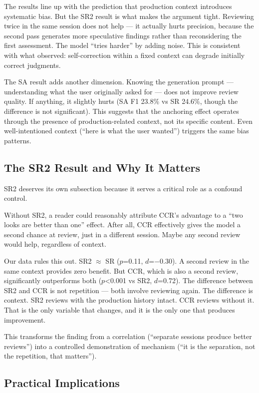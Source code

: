 \documentclass[11pt]{article}
\begin{document}
The results line up with the prediction that production context introduces systematic bias. But the SR2 result is what makes the argument tight. Reviewing twice in the same session does not help --- it actually hurts precision, because the second pass generates more speculative findings rather than reconsidering the first assessment. The model ``tries harder'' by adding noise. This is consistent with what \citet{zhang2025dark} observed: self-correction within a fixed context can degrade initially correct judgments.

The SA result adds another dimension. Knowing the generation prompt --- understanding what the user originally asked for --- does not improve review quality. If anything, it slightly hurts (SA F1 23.8\% vs SR 24.6\%, though the difference is not significant). This suggests that the anchoring effect operates through the presence of production-related context, not its specific content. Even well-intentioned context (``here is what the user wanted'') triggers the same bias patterns.

\subsection{The SR2 Result and Why It Matters}

SR2 deserves its own subsection because it serves a critical role as a confound control.

Without SR2, a reader could reasonably attribute CCR's advantage to a ``two looks are better than one'' effect. After all, CCR effectively gives the model a second chance at review, just in a different session. Maybe any second review would help, regardless of context.

Our data rules this out. SR2 $\approx$ SR ($p$=0.11, $d$=$-$0.30). A second review in the same context provides zero benefit. But CCR, which is also a second review, significantly outperforms both ($p$<0.001 vs SR2, $d$=0.72). The difference between SR2 and CCR is not repetition --- both involve reviewing again. The difference is context. SR2 reviews with the production history intact. CCR reviews without it. That is the only variable that changes, and it is the only one that produces improvement.

This transforms the finding from a correlation (``separate sessions produce better reviews'') into a controlled demonstration of mechanism (``it is the separation, not the repetition, that matters'').

\subsection{Practical Implications}
\end{document}
